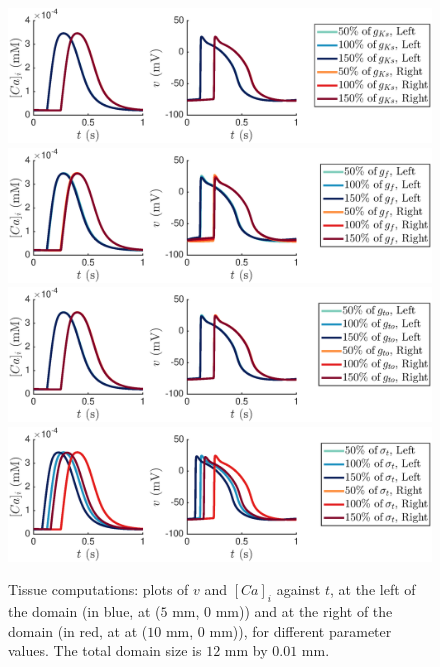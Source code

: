 \documentclass[12pt,a4paper]{article}
\begin{document}
%
\begin{figure}
   \includegraphics[trim=3cm 0cm 4cm 0cm, clip=true, width=1\linewidth]{strip_gks} 
   \includegraphics[trim=3cm 0cm 4cm 0cm, clip=true, width=1\linewidth]{strip_gf} 
      \includegraphics[trim=3cm 0cm 4cm 0cm, clip=true, width=1\linewidth]{strip_gto} 
         \includegraphics[trim=3cm 0cm 4cm 0cm, clip=true, width=1\linewidth]{strip_sigmat} 
    \caption{Tissue computations: plots of $v$ and $[Ca]_i$ against $t$, at the left of the domain (in blue, at ($5$ mm, $0$ mm)) and at the right of the domain (in red, at at ($10$ mm, $0$ mm)), for different parameter values. The total domain size is $12$ mm by $0.01$ mm.}
    \label{fig:5}
\end{figure}
%
\end{document}

